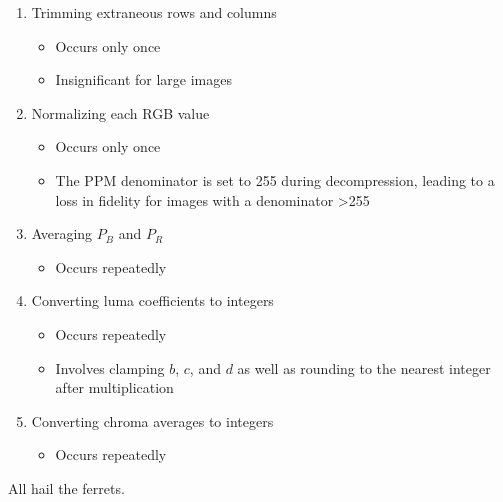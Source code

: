 \documentclass[12pt, letterpaper]{article}
\begin{document}
    \begin{enumerate}
        \item Trimming extraneous rows and columns
        \begin{itemize}
            \item Occurs only once
            \item Insignificant for large images
        \end{itemize}
        \item Normalizing each RGB value
        \begin{itemize}
            \item Occurs only once
            \item The PPM denominator is set to 255 during decompression, leading to a loss in fidelity for images with
            a denominator \textgreater 255
        \end{itemize}
        \item Averaging $P_B$ and $P_R$
        \begin{itemize}
            \item Occurs repeatedly
        \end{itemize}
        \item Converting luma coefficients to integers
        \begin{itemize}
            \item Occurs repeatedly
            \item Involves clamping $b$, $c$, and $d$ as well as rounding to the nearest integer after multiplication
        \end{itemize}
        \item Converting chroma averages to integers
        \begin{itemize}
            \item Occurs repeatedly
        \end{itemize}
    \end{enumerate}

    \vfill
    \begin{center}
        \tiny{All hail the ferrets.}
    \end{center}
\end{document}
